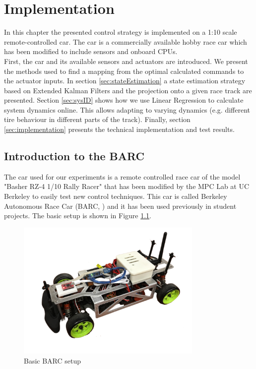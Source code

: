 \chapter{Implementation}
In this chapter the presented control strategy is implemented on a 1:10 scale remote-controlled car. The car is a commercially available hobby race car which has been modified to include sensors and onboard CPUs.\\
First, the car and its available sensors and actuators are introduced. We present the methods used to find a mapping from the optimal calculated commands to the actuator inputs. In section \ref{sec:stateEstimation} a state estimation strategy based on Extended Kalman Filters and the projection onto a given race track are presented. Section \ref{sec:sysID} shows how we use Linear Regression to calculate system dynamics online. This allows adapting to varying dynamics (e.g. different tire behaviour in different parts of the track). Finally, section \ref{sec:implementation} presents the technical implementation and test results.\\

\section{Introduction to the BARC}
The car used for our experiments is a remote controlled race car of the model "Basher RZ-4 1/10 Rally Racer" that has been modified by the MPC Lab at UC Berkeley to easily test new control techniques. This car is called Berkeley Autonomous Race Car (BARC, \cite{BARC}) and it has been used previously in student projects. The basic setup is shown in Figure \ref{fig:BARC}.
\begin{figure}[ht]
    \centering
  \includegraphics[width=0.8\textwidth]{../../Figures/BARC/IMG_1047.pdf}
    \caption{Basic BARC setup}
    \label{fig:BARC}
\end{figure}

